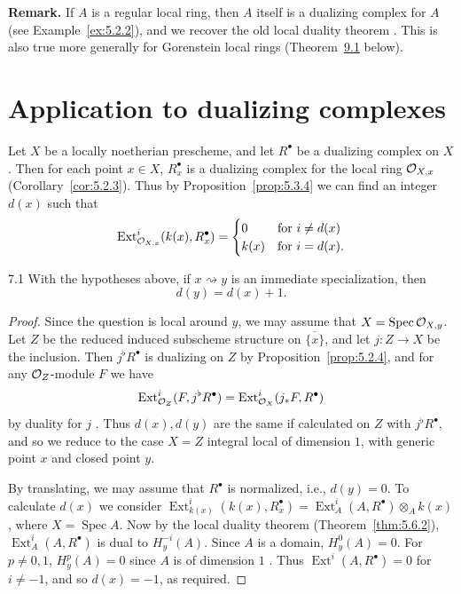 \par\medskip\noindent\textbf{Remark.}
If $A$ is a regular local ring, then $A$ itself is a dualizing complex for $A$ (see Example~\ref{ex:5.2.2}), and we recover the old local duality theorem \cite[]{LC}. This is also true more generally for Gorenstein local rings (Theorem~\hyperref[thm:5.9.1]{9.1} below).
\par\medskip

\section{Application to dualizing complexes}\label{sec:5.7}

Let $X$ be a locally noetherian prescheme, and let $R^\bullet$ be a dualizing complex on $X$. Then for each point $x\in X$, $R_x^\bullet$ is a dualizing complex for the local ring $\mathcal{O}_{X,x}$ (Corollary~\ref{cor:5.2.3}). Thus by Proposition~\ref{prop:5.3.4} we can find an integer $d(x)$ such that
\[
\operatorname{Ext}_{\mathcal{O}_{X,x}}^{i}(k(x), R_{x}^{\bullet}) = \begin{cases} 0 & \text{for } i\neq d(x) \\ k(x) & \text{for } i = d(x). \end{cases}
\]

\begin{bookproposition}{7.1}\label{prop:5.7.1}
With the hypotheses above, if $x\rightsquigarrow y$ is an immediate specialization, then
\[
d(y)=d(x)+1.
\]
\end{bookproposition}

\begin{proof}
Since the question is local around $y$, we may assume that $X=\operatorname{Spec}\mathcal{O}_{X,y}$. Let $Z$ be the reduced induced subscheme structure on $\overline{\{x\}}$, and let $j\colon Z\to X$ be the inclusion. Then $j^{\flat}R^{\bullet}$ is dualizing on $Z$ by Proposition~\ref{prop:5.2.4}, and for any $\mathcal{O}_Z$-module $F$ we have
\[
\operatorname{Ext}_{\mathcal{O}_Z}^{i}(F, j^{\flat}R^{\bullet}) = \operatorname{Ext}_{\mathcal{O}_X}^{i}(j_{*}F, R^{\bullet})
\]
by duality for $j$ . Thus $d(x),d(y)$ are the same if calculated on $Z$ with $j^{\flat}R^{\bullet}$, and so we reduce to the case $X=Z$ integral local of dimension $1$, with generic point $x$ and closed point $y$.

By translating, we may assume that $R^\bullet$ is normalized, i.e., $d(y)=0$. To calculate $d(x)$ we consider $\operatorname{Ext}_{k(x)}^{i}(k(x),R_x^{\bullet})=\operatorname{Ext}_{A}^{i}(A,R^{\bullet})\otimes_{A} k(x)$, where $X=\operatorname{Spec}A$. Now by the local duality theorem (Theorem~\ref{thm:5.6.2}), $\operatorname{Ext}_{A}^{i}(A,R^{\bullet})$ is dual to $H_{y}^{-i}(A)$. Since $A$ is a domain, $H_{y}^{0}(A)=0$. For $p\neq0,1$, $H_{y}^{p}(A)=0$ since $A$ is of dimension $1$ \cite[]{LC}. Thus $\operatorname{Ext}^{i}(A,R^{\bullet})=0$ for $i\neq-1$, and so $d(x)=-1$, as required.
\end{proof}

